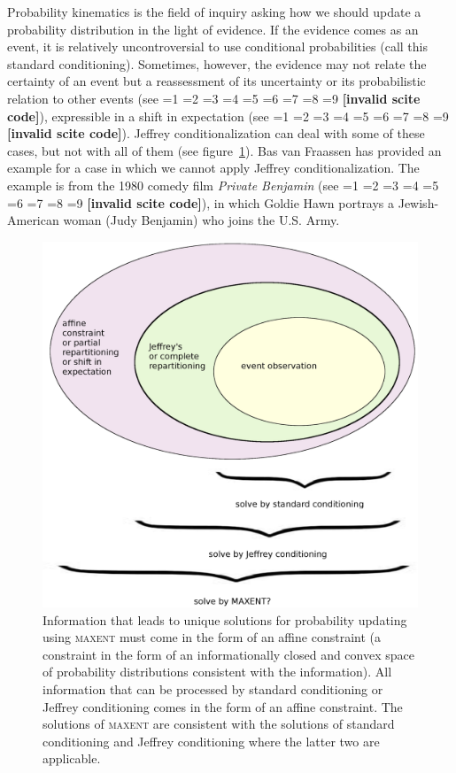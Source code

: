 \documentclass[smallextended]{svjour3}       %
\newcommand{\nonsc}[1]{}
\newcommand{\PageP}{p.~}
\newcommand{\PageP}{}
\newcommand{\scite}[3]{\ifnum#1=1\cite{#2}\else
\ifnum#1=2\cite[{\PageP}~#3]{#2}\else
\ifnum#1=3\cite[{\PageP}~#3]{#2}\else
\ifnum#1=4\cite{#2}\else
\ifnum#1=5\cite{#2}\else
\ifnum#1=6\cite[{\PageP}~#3]{#2}\else
\ifnum#1=7\cite{#2}\else
\ifnum#1=8\cite[{\PageP}~#3]{#2}\else
\ifnum#1=9\cite[{\PageP}~#3]{#2}\else
\textbf{[invalid scite code]}\fi\fi\fi\fi\fi\fi\fi\fi\fi}
\begin{document}
Probability kinematics is the field of inquiry asking how we should
update a probability distribution in the light of evidence. If the
evidence comes as an event, it is relatively uncontroversial to use
conditional probabilities (call this standard conditioning).
Sometimes, however, the evidence may not relate the certainty of an
event but a reassessment of its uncertainty or its probabilistic
relation to other events (see \scite{8}{jeffrey65}{153ff}),
expressible in a shift in expectation (see \scite{7}{hobson71}{}).
Jeffrey conditionalization can deal with some of these cases, but not
with all of them (see figure~\ref{fig:aff}). Bas van Fraassen has
provided an example for a case in which we cannot apply Jeffrey
conditionalization. The example is from the 1980 comedy film
\emph{Private Benjamin} (see \scite{7}{fraassen81}{})\nonsc{}, in
which Goldie Hawn portrays a Jewish-American woman (Judy Benjamin) who
joins the U.S. Army.

\begin{figure}[h!]
  \begin{flushright}
    \begin{minipage}[h]{.8\linewidth}
      \includegraphics[width=\textwidth]{affine1.eps}
      \caption{Information that leads to unique solutions for
        probability updating using \textsc{maxent} must come in the
        form of an affine constraint (a constraint in the form of an
        informationally closed and convex space of probability
        distributions consistent with the information). All
        information that can be processed by standard conditioning or
        Jeffrey conditioning comes in the form of an affine
        constraint. The solutions of \textsc{maxent} are consistent
        with the solutions of standard conditioning and Jeffrey
        conditioning where the latter two are applicable.}
      \label{fig:aff}
    \end{minipage}
  \end{flushright}
\end{figure}
\end{document}
